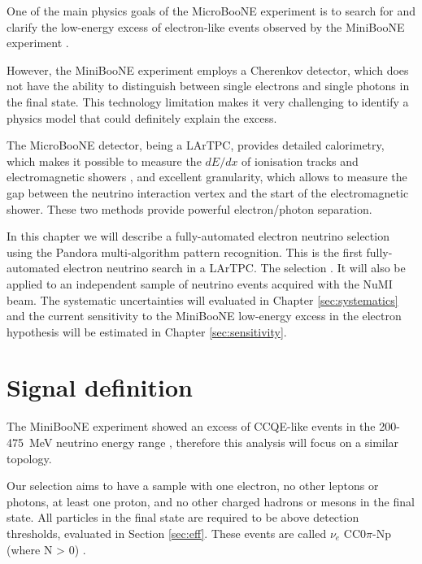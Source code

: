 One of the main physics goals of the MicroBooNE experiment is to search for and clarify the low-energy excess of electron-like events observed by the MiniBooNE experiment \cite{Aguilar-Arevalo:2018gpe}. 

However, the MiniBooNE experiment employs a Cherenkov detector, which does not have the ability to distinguish between single electrons and single photons in the final state. This technology limitation makes it very challenging to identify a physics model that could definitely explain the excess.

The MicroBooNE detector, being a LArTPC, provides detailed  calorimetry, which makes it possible to measure the $dE/dx$ of ionisation tracks and electromagnetic showers \cite{Acciarri:2016sli}, and excellent granularity, which allows to measure the gap between the neutrino interaction vertex and the start of the electromagnetic shower. These two methods provide powerful electron/photon separation.%

In this chapter we will describe a fully-automated electron neutrino selection using the Pandora multi-algorithm pattern recognition. This is the first fully-automated electron neutrino search in a LArTPC. The selection . It will also be applied to an independent sample of neutrino events acquired with the NuMI beam. The systematic uncertainties will evaluated in Chapter \ref{sec:systematics} and the current sensitivity to the MiniBooNE low-energy excess in the electron hypothesis will be estimated in Chapter \ref{sec:sensitivity}.

\section{Signal definition}
The MiniBooNE experiment showed an excess of CCQE-like events in the 200-475~MeV neutrino energy range \cite{Aguilar-Arevalo:2018gpe}, therefore this analysis will focus on a similar topology.

Our selection aims to have a sample with one electron, no other leptons or photons, at least one proton, and no other charged hadrons or mesons in the final state. All particles in the final state are required to be above detection thresholds, evaluated in Section \ref{sec:eff}. These events are called $\nu_{e}$ CC0$\pi$-Np (where N > 0) \cite{Katori:2013nca}. 

